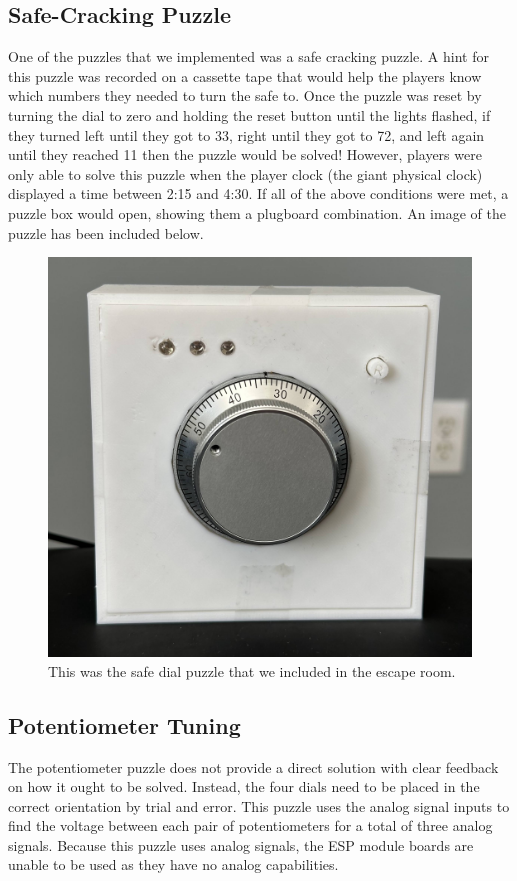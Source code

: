 \documentclass[conference]{IEEEtran}
\begin{document}
\subsection{Safe-Cracking Puzzle} %
One of the puzzles that we implemented was a safe cracking puzzle. A hint for this puzzle was recorded on a cassette tape
that would help the players know which numbers they needed to turn the safe to. Once the puzzle was reset by turning the dial
to zero and holding the reset button until the lights flashed, if they turned left until they got to 33, right until they got to 72,
and left again until they reached 11 then the puzzle would be solved! However, players were only able to solve this puzzle when the
player clock (the giant physical clock) displayed a time between 2:15 and 4:30. If all of the above conditions were met, a puzzle box
would open, showing them a plugboard combination. An image of the puzzle has been included below.
\begin{figure}[ht]
    \centering
    \includegraphics[width=0.90\columnwidth]{Images/dial.jpg}
    \caption{This was the safe dial puzzle that we included in the escape room.}
    \label{fig:dial}
\end{figure}

\subsection{Potentiometer Tuning} %

The potentiometer puzzle does not provide a direct solution with clear feedback on how it ought to be solved. Instead, 
the four dials need to be placed in the correct orientation by trial and error. This puzzle uses the analog signal inputs 
to find the voltage between each pair of potentiometers for a total of three analog signals. Because this puzzle uses analog 
signals, the ESP module boards are unable to be used as they have no analog capabilities.
\end{document}
